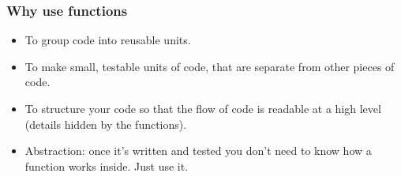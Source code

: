 \documentclass{beamer}
\begin{document}














\begin{frame}
\frametitle{Why use functions}
\begin{itemize}
\item To group code into reusable units.
\item To make small, testable units of code, that are separate from
  other pieces of code.
\item To structure your code so that the flow of code is readable at a high level
  (details hidden by the functions).
\item Abstraction: once it's written and tested you don't need to know
  how a function works inside. Just use it. 
\end{itemize}
\end{frame}
\end{document}
